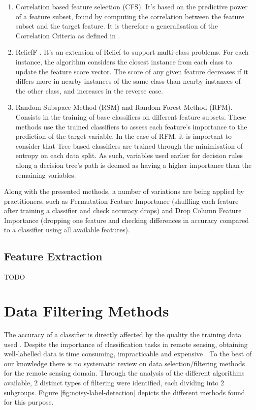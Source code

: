 \documentclass[12pt, english, openany]{book}
\begin{document}
\begin{enumerate}
  \item Correlation based feature selection (CFS). It's based on the predictive
  power of a feature subset, found by computing the correlation between the
  feature subset and the target feature. It is therefore a generalisation
  of the Correlation Criteria as defined in \cite{Ghojogh2019}.
  \item ReliefF \cite{kononenko1997}. It's an extension of Relief
  \cite{kira1992} to support multi-class problems. For each instance, the
  algorithm considers the closest instance from each class to update the
  feature score vector. The score of any given feature decreases if it differs
  more in nearby instances of the same class than nearby instances of the other
  class, and increases in the reverse case.
  \item Random Subspace Method (RSM) and Random Forest Method (RFM). Consists
  in the training of base classifiers on different feature subsets. These
  methods use the trained classifiers to assess each feature's importance to
  the prediction of the target variable. In the case of RFM, it is important to
  consider that Tree based classifiers are trained through the minimisation of
  entropy on each data split. As such, variables used earlier for decision
  rules along a decision tree's path is deemed as having a higher importance
  than the remaining variables.
\end{enumerate}

Along with the presented methods, a number of variations are being applied by
practitioners, such as Permutation Feature Importance (shuffling each feature
after training a classifier and check accuracy drops) and Drop Column Feature
Importance (dropping one feature and checking differences in accuracy compared
to a classifier using all available features).


\subsection*{Feature Extraction}
TODO


\section{Data Filtering Methods}

The accuracy of a classifier is directly affected by the quality the training
data used \cite{Boukir2019}. Despite the importance of classification tasks in
remote sensing, obtaining well-labelled data is time consuming, impracticable
and expensive \cite{Pelletier2017Filtering}. To the best of our knowledge there
is no systematic review on data selection/filtering methods for the remote
sensing domain. Through the analysis of the different algorithms available, 2
distinct types of filtering were identified, each dividing into 2 subgroups.
Figure \ref{fig:noisy-label-detection} depicts the different methods found for
this purpose.
\end{document}
